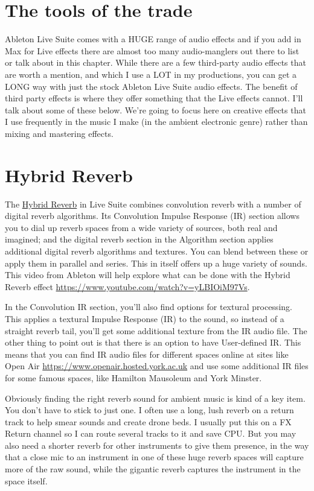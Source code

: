 \documentclass[
  12pt,
  letterpaper,
  oneside,
  open=any]{scrbook}
\begin{document}
\section{The tools of the trade}\label{the-tools-of-the-trade}

Ableton Live Suite comes with a HUGE range of audio effects and if you
add in Max for Live effects there are almost too many audio-manglers out
there to list or talk about in this chapter. While there are a few
third-party audio effects that are worth a mention, and which I use a
LOT in my productions, you can get a LONG way with just the stock
Ableton Live Suite audio effects. The benefit of third party effects is
where they offer something that the Live effects cannot. I'll talk about
some of these below. We're going to focus here on creative effects that
I use frequently in the music I make (in the ambient electronic genre)
rather than mixing and mastering effects.

\section{Hybrid Reverb}\label{hybrid-reverb}

The
\href{https://www.ableton.com/en/live-manual/11/live-audio-effect-reference/\#hybrid-reverb}{Hybrid
Reverb} in Live Suite combines convolution reverb with a number of
digital reverb algorithms. Its Convolution Impulse Response (IR) section
allows you to dial up reverb spaces from a wide variety of sources, both
real and imagined; and the digital reverb section in the Algorithm
section applies additional digital reverb algorithms and textures. You
can blend between these or apply them in parallel and series. This in
itself offers up a huge variety of sounds. This video from Ableton will
help explore what can be done with the Hybrid Reverb effect
\url{https://www.youtube.com/watch?v=yLBIOiM97Vs}.

In the Convolution IR section, you'll also find options for textural
processing. This applies a textural Impulse Response (IR) to the sound,
so instead of a straight reverb tail, you'll get some additional texture
from the IR audio file. The other thing to point out is that there is an
option to have User-defined IR. This means that you can find IR audio
files for different spaces online at sites like Open Air
\url{https://www.openair.hosted.york.ac.uk} and use some additional IR
files for some famous spaces, like Hamilton Mausoleum and York Minster.

Obviously finding the right reverb sound for ambient music is kind of a
key item. You don't have to stick to just one. I often use a long, lush
reverb on a return track to help smear sounds and create drone beds. I
usually put this on a FX Return channel so I can route several tracks to
it and save CPU. But you may also need a shorter reverb for other
instruments to give them presence, in the way that a close mic to an
instrument in one of these huge reverb spaces will capture more of the
raw sound, while the gigantic reverb captures the instrument in the
space itself.
\end{document}
